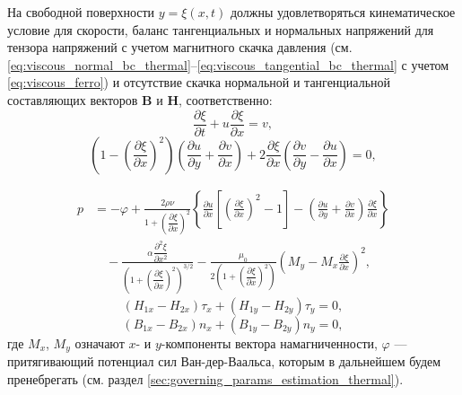 \documentclass[12pt,a4paper]{article}
\begin{document}
На свободной поверхности $y=\xi(x,t)$ должны удовлетворяться
кинематическое условие для скорости, баланс тангенциальных и нормальных
напряжений для тензора напряжений с учетом магнитного скачка
давления (см. \eqref{eq:viscous_normal_bc_thermal}--\eqref{eq:viscous_tangential_bc_thermal} с учетом \eqref{eq:viscous_ferro}) и отсутствие скачка нормальной и тангенциальной составляющих
векторов $\mathbf{B}$ и $\mathbf{H}$, соответственно:
\begin{equation}
	\frac{\partial \xi}{\partial t}
	+
	u\frac{\partial \xi}{\partial x}
	=
	v,
\end{equation}
\begin{equation}
	\left(
	1-
	\left(
	\frac{\partial \xi}{\partial x}
	\right)^2
	\right)
	\left(
	\frac{\partial u}{\partial y}
	+
	\frac{\partial v}{\partial x}
	\right)
	+
	2\frac{\partial \xi}{\partial x}
	\left(
	\frac{\partial v}{\partial y}
	-
	\frac{\partial u}{\partial x}
	\right)
	=
	0,
\end{equation}

\begin{equation}
	\begin{aligned}
		p
		&=
		-\varphi
		+
		\frac{2\rho\nu}
		{1+\left(\dfrac{\partial \xi}{\partial x}\right)^2}
		\left\{
		\frac{\partial u}{\partial x}
		\left[
		\left(
		\frac{\partial \xi}{\partial x}
		\right)^2
		-1
		\right]
		-
		\left(
		\frac{\partial u}{\partial y}
		+
		\frac{\partial v}{\partial x}
		\right)
		\frac{\partial \xi}{\partial x}
		\right\}
		\\
		&\quad
		-
		\frac{\alpha \dfrac{\partial^2 \xi}{\partial x^2}}
		{\left(
			1+
			\left(
			\dfrac{\partial \xi}{\partial x}
			\right)^2
			\right)^{3/2}}
		-
		\frac{\mu_0}
		{2\left(
			1+
			\left(
			\dfrac{\partial \xi}{\partial x}
			\right)^2
			\right)}
		\left(
		M_y
		-
		M_x
		\frac{\partial \xi}{\partial x}
		\right)^2,
	\end{aligned}
\end{equation}
\begin{equation}
	(H_{1x}-H_{2x})\tau_x
	+
	(H_{1y}-H_{2y})\tau_y
	=
	0,
\end{equation}
\begin{equation}
	(B_{1x}-B_{2x})n_x
	+
	(B_{1y}-B_{2y})n_y
	=
	0,
\end{equation}
где $M_x$, $M_y$ означают $x$- и $y$-компоненты вектора намагниченности,
$\varphi$ --- притягивающий потенциал сил Ван-дер-Ваальса, которым в дальнейшем будем пренебрегать (см. раздел \ref{sec:governing_params_estimation_thermal}). 
\end{document}
